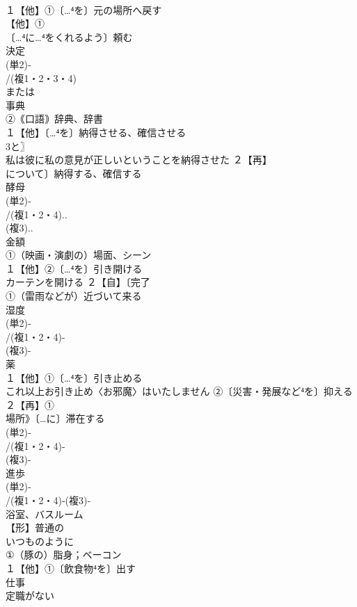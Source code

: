 \documentclass[8pt]{extreport}
\begin{document}
\begin{CJK}{UTF8}{min}
\\	１【他】①〔…⁴を〕元の場所へ戻す
\\	【他】①
\\	〔…⁴に…⁴をくれるよう〕頼む
\\	決定 
\\	(単2)‐
\\	/(複1・2・3・4)
\\	または
\\	事典 
\\	②｟口語｠辞典、辞書
\\	１【他】〔…⁴を〕納得させる、確信させる
\\	3と〗
\\	私は彼に私の意見が正しいということを納得させた ２【再】
\\	について〕納得する、確信する
\\	酵母 
\\	(単2)‐
\\	/(複1・2・4)..
\\	(複3)..
\\	金額
\\	①（映画・演劇の）場面、シーン 
\\	１【他】②〔…⁴を〕引き開ける 
\\	カーテンを開ける ２【自】〔完了
\\	①（雷雨などが）近づいて来る
\\	湿度
\\	(単2)‐
\\	/(複1・2・4)-
\\	(複3)-
\\	薬 
\\	１【他】①〔…⁴を〕引き止める　 
\\	これ以上お引き止め〈お邪魔〉はいたしません ②〔災害・発展など⁴を〕抑える ２【再】①
\\	場所》〔…に〕滞在する
\\	(単2)‐
\\	/(複1・2・4)-
\\	(複3)-
\\	進歩 
\\	(単2)‐
\\	/(複1・2・4)‐(複3)‐
\\	浴室、バスルーム
\\	【形】普通の 
\\	いつものように
\\	①（豚の）脂身；ベーコン 
\\	１【他】①〔飲食物⁴を〕出す 
\\	仕事 
\\	定職がない

\end{CJK}
\end{document}
